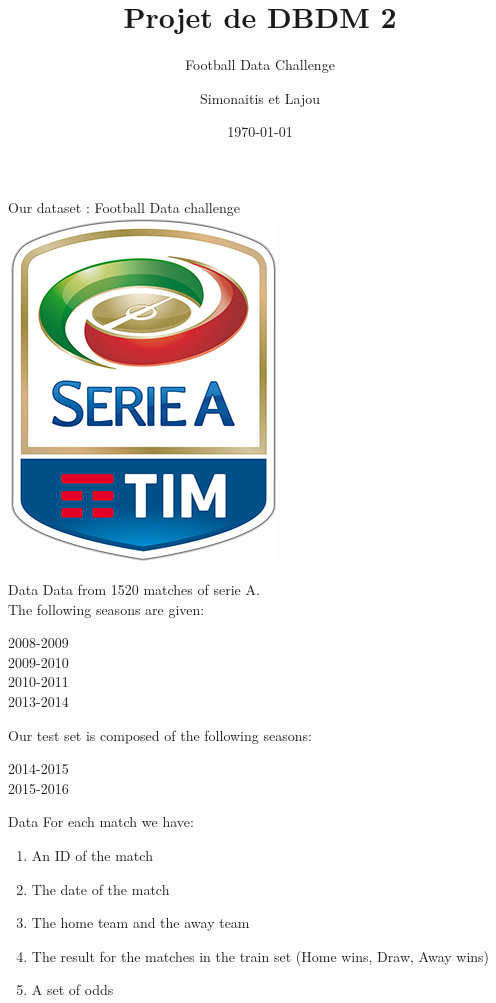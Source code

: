 \documentclass[french]{beamer}
\title{Projet de DBDM 2}
\subtitle{Football Data Challenge}
\author{Simonaitis et Lajou}
\date{\today}
\begin{document}
\begin{frame}
	\maketitle
\end{frame}

\begin{frame}
	\begin{center}
		Our dataset : Football Data challenge
		\includegraphics[scale=0.5]{LegaSerieAlogoTIM.png}
	\end{center}
\end{frame}

\begin{frame}{Data}
	Data from 1520 matches of serie A.\\
	The following seasons are given:\\
	\begin{center}
		2008-2009\\
		2009-2010\\
		2010-2011\\
		2013-2014\\
	\end{center}
	Our test set is composed of the following seasons:\\
	\begin{center}
		2014-2015\\
		2015-2016\\
	\end{center}
\end{frame}


\begin{frame}{Data}
	For each match we have:
	\begin{enumerate}
		\item An ID of the match
		\item The date of the match
		\item The home team and the away team
		\item The result for the matches in the train set (Home wins, Draw, Away wins)
		\item A set of odds
	\end{enumerate}
\end{frame}
\end{document}
